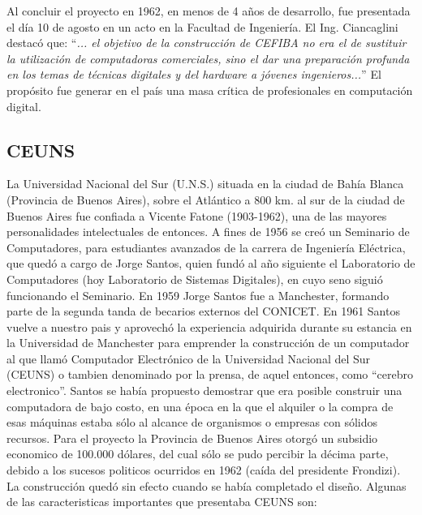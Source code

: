 \documentclass[%
 	final,
%
	notitlepage,
	narroweqnarray,
	inline,
 	twoside,
	]{ieee}
\begin{document}
Al concluir el proyecto en 1962, en menos de 4 a\~nos de desarrollo, fue presentada el d\'ia 10 de agosto en un acto en la Facultad de Ingenier\'ia. El Ing. Ciancaglini destac\'o que: ``\textit{... el objetivo de la construcci\'on de CEFIBA no era el de sustituir la utilizaci\'on de computadoras comerciales, sino el dar una preparaci\'on profunda en los temas de t\'ecnicas digitales y del hardware a j\'ovenes ingenieros...}'' El prop\'osito fue generar en el pa\'is una masa cr\'itica de profesionales en computaci\'on digital.


\subsection*{CEUNS}
La Universidad Nacional del Sur (U.N.S.) situada en la ciudad de Bah\'ia Blanca (Provincia de Buenos Aires), sobre el Atl\'antico a 800 km. al sur de la ciudad de Buenos Aires fue confiada a Vicente Fatone (1903-1962), una de las mayores personalidades intelectuales de entonces. A fines de 1956 se cre\'o un Seminario de Computadores, para estudiantes avanzados de la carrera de Ingenier\'ia El\'ectrica, que qued\'o a cargo de Jorge Santos, quien fund\'o al a\~no siguiente el Laboratorio de Computadores (hoy Laboratorio de Sistemas Digitales), en cuyo seno sigui\'o funcionando el Seminario.
En 1959 Jorge Santos fue a Manchester, formando parte de la segunda tanda de becarios externos del CONICET. En 1961 Santos vuelve a nuestro pais y aprovech\'o la experiencia adquirida durante su estancia en la Universidad de Manchester para emprender la construcci\'on de un computador al que llam\'o Computador Electr\'onico de la Universidad Nacional del Sur (CEUNS) o tambien denominado por la prensa, de aquel entonces, como “cerebro electronico”. Santos se hab\'ia propuesto demostrar que era posible construir una  computadora de bajo costo, en una \'epoca en la que el alquiler o la compra de esas m\'aquinas estaba s\'olo al alcance de organismos o empresas con s\'olidos recursos. Para el proyecto la Provincia de Buenos Aires otorg\'o un subsidio economico de  100.000 d\'olares, del cual s\'olo se pudo percibir la d\'ecima parte, debido a los sucesos politicos ocurridos en 1962 (ca\'ida del presidente Frondizi). La construcci\'on qued\'o sin efecto cuando se hab\'ia completado el dise\~no.
Algunas de las caracteristicas importantes que presentaba CEUNS son:
\end{document}
